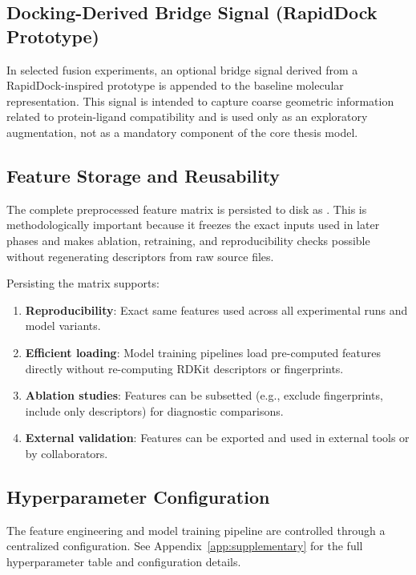 \documentclass[a4paper,11pt,twoside]{report}
\begin{document}
\subsection{Docking-Derived Bridge Signal (RapidDock Prototype)}

In selected fusion experiments, an optional bridge signal derived from a RapidDock-inspired prototype is appended to the baseline molecular representation. This signal is intended to capture coarse geometric information related to protein-ligand compatibility and is used only as an exploratory augmentation, not as a mandatory component of the core thesis model.

\subsection{Feature Storage and Reusability}

The complete preprocessed feature matrix is persisted to disk as . This is methodologically important because it freezes the exact inputs used in later phases and makes ablation, retraining, and reproducibility checks possible without regenerating descriptors from raw source files.

Persisting the matrix supports:
\begin{enumerate}
\item \textbf{Reproducibility}: Exact same features used across all experimental runs and model variants.
\item \textbf{Efficient loading}: Model training pipelines load pre-computed features directly without re-computing RDKit descriptors or fingerprints.
\item \textbf{Ablation studies}: Features can be subsetted (e.g., exclude fingerprints, include only descriptors) for diagnostic comparisons.
\item \textbf{External validation}: Features can be exported and used in external tools or by collaborators.
\end{enumerate}

\subsection{Hyperparameter Configuration}

The feature engineering and model training pipeline are controlled through a centralized configuration. See Appendix~\ref{app:supplementary} for the full hyperparameter table and configuration details.
\end{document}
